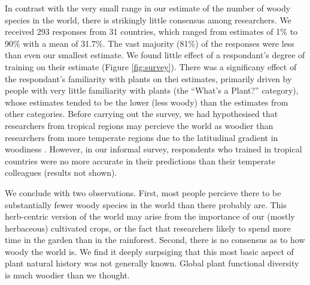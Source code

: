 \documentclass[12pt]{article}
\begin{document}
In contrast with the very small range in our estimate of the number of
woody species in the world, there is strikingly little consensus among
researchers.  We received 293 responses from 31 countries, which
ranged from estimates of 1\% to 90\% with a mean of 31.7\%.  The vast
majority (81\%) of the responses were less than even our smallest
estimate.
We found little effect of a respondant's degree of training on their
estimate (Figure \ref{fig:survey}).  There was a significany effect of
the respondant's familiarity with plants on thei estimates, primarily
driven by people with very little familiarity with plants (the
``What's a Plant?'' category), whose estimates tended to be the lower
(less woody) than the estimates from other categories.
% 
Before carrying out the survey, we had hypothesised that researchers
from tropical regions may percieve the world as woodier than
researchers from more temperate regions due to the latitudinal
gradient in woodiness \citep{Molesheihgt}.  However, in our informal
survey, respondents who trained in tropical countries were no more
accurate in their predictions than their temperate colleagues (results
not shown).

We conclude with two observations.  
%
First, most people percieve there to be substantially fewer woody
species in the world than there probably are.  This herb-centric
version of the world may arise from the importance of our (mostly
herbaceous) cultivated crops, or the fact that researchers likely to
spend more time in the garden than in the rainforest.
%
Second, there is no consensus as to how woody the world is.  We find
it deeply surpsiging that this most basic aspect of plant natural
history was not generally known.  Global plant functional diversity is
much woodier than we thought.



\end{document}
